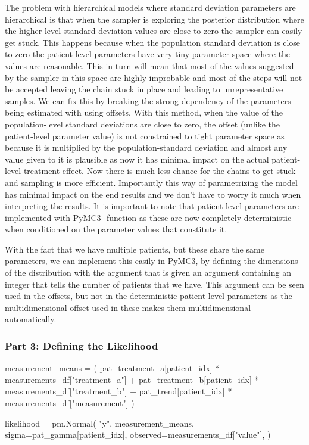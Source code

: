 \documentclass[12pt,a4paper,leqno]{report}
\theoremstyle{plain}
\theoremstyle{definition}
\theoremstyle{remark}
\begin{document}
The problem with hierarchical
models where standard deviation parameters are hierarchical is that when the sampler is
exploring the posterior distribution where the higher level standard deviation values
are close to zero the sampler can easily get stuck. This happens because
when the population standard deviation is close to zero the patient level parameters
have very tiny parameter space where the values are reasonable. This in turn will mean
that most of the values suggested by the sampler in this space are highly improbable and
most of the steps will not be accepted leaving the chain stuck in place and leading to
unrepresentative samples. We can fix this by breaking the strong dependency of the
parameters being estimated with using offsets. With this method, when the value of the
population-level standard deviations are close to zero, the offset (unlike the
patient-level parameter value) is not constrained to tight parameter space as because it is
multiplied by the population-standard deviation and almost any value given to it is
plausible as now it has minimal impact on the actual patient-level treatment effect.
Now there is much less chance for the chains to get stuck and sampling is more
efficient. Importantly this way of parametrizing the model has minimal impact on the end
results and we don't have to worry it much when interpreting the results. It is
important to note that patient level parameters are implemented with PyMC3
-function as these are now completely deterministic when conditioned
on the parameter values that constitute it.\cite{offset}

With the fact that we have multiple patients, but these share the same parameters,
we can implement this easily in PyMC3, by defining the dimensions of the distribution
with the  argument that is given an argument containing an integer that tells
the number of patients that we have. This argument can be seen used in the offsets, but not in the
deterministic patient-level parameters as the multidimensional offset used in these
makes them multidimensional automatically.

\subsubsection*{Part 3: Defining the Likelihood}

\bigskip
\begin{pyverbatim}[][fontsize=\footnotesize]
    measurement_means = (
        pat_treatment_a[patient_idx] * measurements_df["treatment_a"]
        + pat_treatment_b[patient_idx] * measurements_df["treatment_b"]
        + pat_trend[patient_idx] * measurements_df["measurement"]
    )

    likelihood = pm.Normal(
        "y",
        measurement_means,
        sigma=pat_gamma[patient_idx],
        observed=measurements_df["value"],
    )
\end{pyverbatim}
\smallskip
\end{document}
